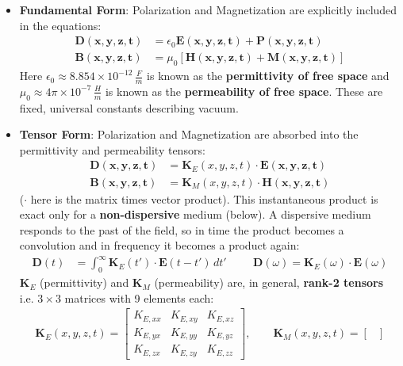 \begin{itemize}
  \item \textbf{Fundamental Form}: Polarization and Magnetization are explicitly
    included in the equations:
    \begin{align*}
      \mathbf{D(x,y,z,t)} &= \epsilon_0 \mathbf{E(x,y,z,t)} + \mathbf{P(x,y,z,t)} \tag{10a} \\
      \mathbf{B(x,y,z,t)} &= \mu_0 \left[\mathbf{H(x,y,z,t)} + \mathbf{M(x,y,z,t)}\right] \tag{10b}
    \end{align*}
    Here \( \epsilon_0 \approx 8.854 \times 10^{-12} \, \frac{F}{m} \) is known
    as the \textbf{permittivity of free space} and \( \mu_0 \approx 4\pi \times 10^{-7} \, \frac{H}{m} \)
    is known as the \textbf{permeability of free space}. These are fixed, universal
    constants describing vacuum.
  \item \textbf{Tensor Form}: Polarization and Magnetization are absorbed into the
    permittivity and permeability tensors:
    \begin{align*}
      \mathbf{D(x,y,z,t)} &= \mathbf{K}_E(x,y,z,t) \cdot \mathbf{E(x,y,z,t)} \tag{11a} \\
      \mathbf{B(x,y,z,t)} &= \mathbf{K}_M(x,y,z,t) \cdot \mathbf{H(x,y,z,t)} \tag{11b}
    \end{align*}
    (\(\cdot\) here is the matrix times vector product). This instantaneous product
    is exact only for a \textbf{non-dispersive} medium (below). A dispersive
    medium responds to the past of the field, so in time the product becomes
    a convolution and in frequency it becomes a product again:
    \begin{align*}
      \mathbf{D}(t) &= \int_0^{\infty} \mathbf{K}_E(t') \cdot \mathbf{E}(t - t')\, dt' \hspace{1cm}
      \mathbf{D}(\omega) = \mathbf{K}_E(\omega) \cdot \mathbf{E}(\omega)
    \end{align*}
    \( \mathbf{K}_E \) (permittivity) and \( \mathbf{K}_M \)
    (permeability) are, in general, \textbf{rank-2 tensors} i.e. \( 3 \times 3 \)
    matrices with 9 elements each:
    \begin{align*}
      \mathbf{K}_E(x,y,z,t) = \begin{bmatrix}
        K_{E,xx} & K_{E,xy} & K_{E,xz} \\
        K_{E,yx} & K_{E,yy} & K_{E,yz} \\
        K_{E,zx} & K_{E,zy} & K_{E,zz}
      \end{bmatrix}, \qquad
      \mathbf{K}_M(x,y,z,t) = \begin{bmatrix}

\end{bmatrix}
\end{align*}
\end{itemize}
